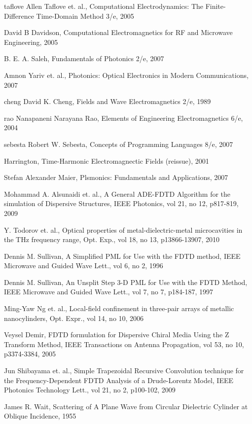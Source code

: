 \cleardoublepage
{}
\begin{thebibliography}{999}
  \bibitem
  {taflove}
  Allen Taflove et. al., Computational Electrodynamics: The Finite-Difference Time-Domain Method 3/e, 2005
 
  \bibitem
  {}
  David B Davidson, Computational Electromagnetics for RF and Microwave Engineering, 2005

  \bibitem
  {}
  B. E. A. Saleh, Fundamentals of Photonics 2/e, 2007

  \bibitem
  {}
  Amnon Yariv et. al., Photonics: Optical Electronics in Modern Communications, 2007

  \bibitem
  {cheng}
  David K. Cheng, Fields and Wave Electromagnetics 2/e, 1989

  \bibitem
  {rao} 
  Nanapaneni Narayana Rao, Elements of Engineering Electromagnetics 6/e, 2004

  \bibitem
  {sebesta}
  Robert W. Sebesta, Concepts of Programming Languages 8/e, 2007

  \bibitem
  {}
  Harrington, Time-Harmonic Electromagnectic Fields (reissue), 2001

  \bibitem
  {}
  Stefan Alexander Maier, Plsmonics: Fundamentals and Applications, 2007

  \bibitem
  {}
  Mohammad A. Alsunaidi et. al., A General ADE-FDTD Algorithm for the simulation of Dispersive Structures, IEEE Photonics, vol 21, no 12, p817-819, 2009

  \bibitem
  {}
  Y. Todorov et. al., Optical properties of metal-dielectric-metal microcavities in the THz frequency range, Opt. Exp., vol 18, no 13, p13866-13907, 2010

  \bibitem
  {}
  Dennis M. Sullivan, A Simplified PML for Use with the FDTD method, IEEE Microwave and Guided Wave Lett., vol 6, no 2, 1996

  \bibitem
  {}
  Dennis M. Sullivan, An Unsplit Step 3-D PML for Use with the FDTD Method, IEEE Microwave and Guided Wave Lett., vol 7, no 7, p184-187, 1997

  \bibitem
  {}
  Ming-Yaw Ng et. al., Local-field confinement in three-pair arrays of metallic nanocylinders, Opt. Expr., vol 14, no 10, 2006

  \bibitem
  {}
  Veysel Demir, FDTD formulation for Dispersive Chiral Media Using the Z Transform Method, IEEE Transactions on Antenna Propagation, vol 53, no 10, p3374-3384, 2005

  \bibitem
  {}  
  Jun Shibayama et. al., Simple Trapezoidal Recursive Convolution technique for the Frequency-Dependent FDTD Analysis of a Drude-Lorentz Model, IEEE Photonics Technology Lett., vol 21, no 2, p100-102, 2009

  \bibitem
  {}
  James R. Wait, Scattering of A Plane Wave from Circular Dielectric Cylinder at Oblique Incidence, 1955

\end{thebibliography}
